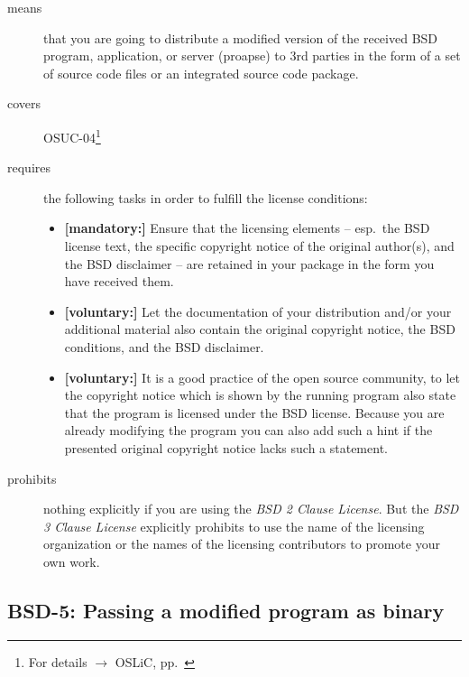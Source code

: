 \begin{description}
\item[means] that you are going to distribute a modified version of the received
BSD program, application, or server (proapse) to 3rd parties in the form of a set
of source code files or an integrated source code package.
\item[covers] OSUC-04\footnote{For details $\rightarrow$ OSLiC, pp.\ \pageref{OSUC-04-DEF}}
\item[requires] the following tasks in order to fulfill the license conditions:
\begin{itemize}
  \item \textbf{[mandatory:]} Ensure that the licensing elements -- esp.\
  the BSD license text, the specific copyright notice of the original author(s),
  and the BSD disclaimer -- are retained in your package in the form you have
  received them.
  
  \item \textbf{[voluntary:]} Let the documentation of your distribution and/or
  your additional material also contain the original copyright notice, the BSD
  conditions, and the BSD disclaimer.
  
  \item \textbf{[voluntary:]} It is a good practice of the open source
  community, to let the copyright notice which is shown by the running program
  also state that the program is licensed under the BSD license. Because you are
  already modifying the program you can also add such a hint if the presented
  original copyright notice lacks such a statement.
\end{itemize}

\item[prohibits] nothing explicitly if you are using the \emph{BSD 2 Clause
License}. But the \emph{BSD 3 Clause License} explicitly prohibits to use the
name of the licensing organization or the names of the licensing contributors to
promote your own work.

\end{description}

\subsection{BSD-5: Passing a modified program as binary}

